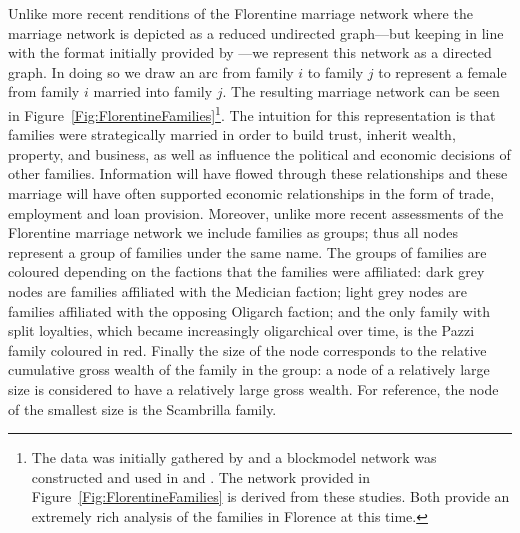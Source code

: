 \documentclass[11pt,fleqn]{article}
\begin{document}
Unlike more recent renditions of the Florentine marriage network where the marriage network is depicted as a reduced undirected graph---but keeping in line with the format initially provided by \citet[p.~1276--1277]{Padgett1993}---we represent this network as a directed graph. In doing so we draw an arc from family $i$ to family $j$ to represent a female from family $i$ married into family $j$. The resulting marriage network can be seen in Figure~\ref{Fig:FlorentineFamilies}\footnote{The data was initially gathered by \citet{Kent1978} and a blockmodel network was constructed and used in \citet{Padgett1993} and \citet{Padgett1994}. The network provided in Figure~\ref{Fig:FlorentineFamilies} is derived from these studies. Both provide an extremely rich analysis of the families in Florence at this time.}. The intuition for this representation is that families were strategically married in order to build trust, inherit wealth, property, and business, as well as influence the political and economic decisions of other families. Information will have flowed through these relationships and these marriage will have often supported economic relationships in the form of trade, employment and loan provision. Moreover, unlike more recent assessments of the Florentine marriage network we include families as groups; thus all nodes represent a group of families under the same name. The groups of families are coloured depending on the factions that the families were affiliated: dark grey nodes are families affiliated with the Medician faction; light grey nodes are families affiliated with the opposing Oligarch faction; and the only family with split loyalties, which became increasingly oligarchical over time, is the Pazzi family coloured in red. Finally the size of the node corresponds to the relative cumulative gross wealth of the family in the group: a node of a relatively large size is considered to have a relatively large gross wealth. For reference, the node of the smallest size is the Scambrilla family.
\end{document}
